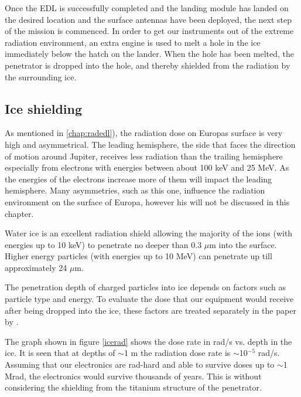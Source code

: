 
Once the EDL is successfully completed and the landing module has landed on the desired location and the surface antennas have been deployed, the next step of the mission is commenced. In order to get our instruments out of the extreme radiation environment, an extra engine is used to melt a hole in the ice immediately below the hatch on the lander. When the hole has been melted, the penetrator is dropped into the hole, and thereby shielded from the radiation by the surrounding ice. 

\subsection{Ice shielding}

As mentioned in \ref{chap:radedl}), the radiation dose on Europas surface is very high and asymmetrical. The leading hemisphere, the side that faces the direction of motion around Jupiter, receives less radiation than the trailing hemisphere especially from electrons with energies between about 100 keV and
25 MeV. As the energies of the electrons increase more of them will impact the leading hemisphere. Many asymmetries, such as this one, influence the radiation environment on the surface of Europa, however his will not be discussed in this chapter. 

Water ice is an excellent radiation shield allowing the majority of the ions (with energies up to 10 keV) to penetrate no deeper than 0.3 $\mu$m into the surface. Higher energy particles (with energies up to 10 MeV) can penetrate up till approximately 24 $\mu$m\cite{Paranicas_2009}.

The penetration depth of charged particles into ice depends on factors such as particle type and energy. To evaluate the dose that our equipment would receive after being dropped into the ice, these factors are treated separately in the paper by \citet{Paranicas_2009}.

The graph shown in figure \ref{icerad} shows the dose rate in rad/s vs. depth in the ice. 
It is seen that at depths of $\sim$1 m the radiation dose rate is $\sim$10$^{-5}$ rad/s. Assuming that our electronics are rad-hard and able to survive doses up to $\sim$1 Mrad, the electronics would survive thousands of years. This is without considering the shielding from the titanium structure of the penetrator. 

